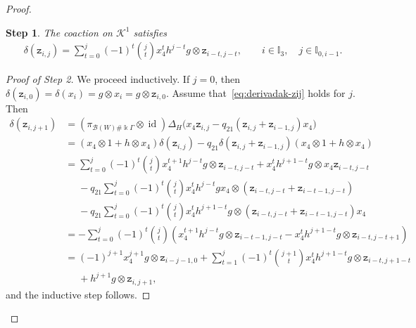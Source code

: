 \documentclass[10pt,a4paper]{amsart}
\numberwithin{equation}{section}
\newtheorem{step}{Step}
\newcommand{\id}{\operatorname{id}}
\newcommand{\toba}{\mathscr B}
\newcommand{\K}{{\mathcal{K}}}
\newcommand{\I}{{\mathbb I}}
\newcommand{\zc}[2]{\mathtt{z}_{#1,#2}}
\begin{document}
\begin{proof}
\begin{step}
The coaction on $\K^1$ satisfies
\begin{align*}%
\delta(\zc{i}{j}) = \sum_{t=0}^{j}(-1)^t\binom{j}{t} x_{4}^t h^{j-t}g \otimes \zc{i-t}{j-t},\qquad
 i\in\I_3, \quad j\in\I_{0,i-1}.
\end{align*}
\end{step}

\begin{proof}[Proof of Step 2]
We proceed inductively.
If $j=0$, then $ \delta(\zc{i}{0})=\delta(x_i)=g\otimes x_i =g\otimes \zc{i}{0}$.
Assume that~\eqref{eq:derivadak-zij} holds for $j$. Then
\begin{align*}
\delta ( \zc{i}{j+1}) &= (\pi _{\toba (W)\# \Bbbk \Gamma}\otimes \id)\Delta _{H} \big(x_{4} \zc{i}{j}-q_{21}(\zc{i}{j}+\zc{i-1}{j})x_{4}\big)
\\[1mm]
&= (x_{4}\otimes 1+h\otimes x_{4})\delta(\zc{i}{j})-q_{21}\delta(\zc{i}{j}+\zc{i-1}{j})(x_{4}\otimes 1+h\otimes x_{4})
\\
&=\sum_{t=0}^{j}(-1)^t\binom{j}{t} x_{4}^{t+1} h^{j-t}g \otimes \zc{i-t}{j-t}
+ x_{4}^t h^{j+1-t}g \otimes x_{4}\zc{i-t}{j-t}
\\
&\phantom{=} -q_{21} \sum_{t=0}^{j}(-1)^t\binom{j}{t} x_{4}^{t} h^{j-t}gx_{4} \otimes (\zc{i-t}{j-t}+\zc{i-t-1}{j-t})
\\
&\phantom{=} -q_{21} \sum_{t=0}^{j}(-1)^t\binom{j}{t}x_{4}^t h^{j+1-t}g \otimes (\zc{i-t}{j-t}+\zc{i-t-1}{j-t})x_{4}
\\
&=-\sum_{t=0}^{j}(-1)^t\binom{j}{t} (x_{4}^{t+1} h^{j-t}g \otimes \zc{i-t-1}{j-t}
- x_{4}^t h^{j+1-t}g \otimes \zc{i-t}{j-t+1})
\\
&= (-1)^{j+1} x_{4}^{j+1} g \otimes \zc{i-j-1}{0}
+\sum_{t=1}^{j}(-1)^t\binom{j+1}{t} x_{4}^t h^{j+1-t}g \otimes \zc{i-t}{j+1-t}
\\
&\phantom{=} +h^{j+1}g \otimes \zc{i}{j+1},
\end{align*}
and the inductive step follows.
\end{proof}




\end{proof}
\end{document}
